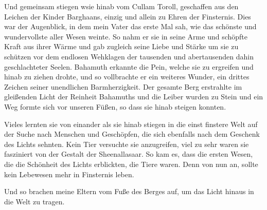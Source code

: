 \documentclass[10pt,twoside,BCOR=12mm,DIV=classic]{scrbook}
\begin{document}
Und gemeinsam stiegen wsie hinab vom Cullam Toroll, geschaffen aus den Leichen
der Kinder Barghaans, einzig und allein zu Ehren der Finsternis. Dies war der
Augenblick, in dem mein Vater das erste Mal sah, wie das schönste und
wundervollste aller Wesen weinte. So nahm er sie in seine Arme und schöpfte
Kraft aus ihrer Wärme und gab zugleich seine Liebe und Stärke um sie zu schützen
vor dem endlosen Wehklagen der tausenden und abertausenden dahin geschlachteter
Seelen.
Bahamuth erkannte die Pein, welche sie zu ergreifen und hinab zu ziehen drohte,
und so vollbrachte er ein weiteres Wunder, ein drittes Zeichen seiner
unendlichen Barmherzigkeit. Der gesamte Berg erstrahlte im gleißenden Licht der
Reinheit Bahamuths und die Leiber wurden zu Stein und ein Weg formte sich vor
unseren Füßen, so dass sie hinab steigen konnten.

Vieles lernten sie von einander als sie hinab stiegen in die einst finstere Welt
auf der Suche nach Menschen und Geschöpfen, die sich ebenfalls nach dem Geschenk
des Lichts sehnten. Kein Tier versuchte sie anzugreifen, viel zu sehr waren sie
fasziniert von der Gestalt der Sheenallasaar. So kam es, dass die ersten Wesen,
die die Schönheit des Lichts erblickten, die Tiere waren. Denn von nun an,
sollte kein Lebewesen mehr in Finsternis leben.

Und so brachen meine Eltern vom Fuße des Berges auf, um das Licht hinaus in die
Welt zu tragen.
\end{document}

